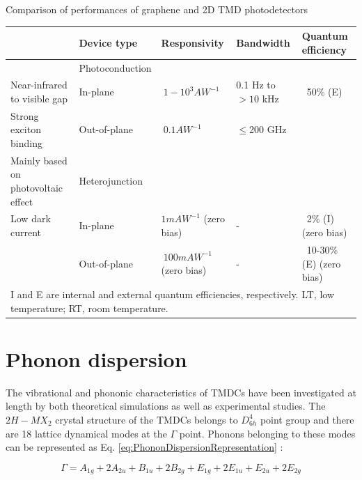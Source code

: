 \newpage
\begin{table}[!ht]
	\label{tab:GrapheneTMDCPhotodectorsComparison}
	\caption{Comparison of performances of graphene and 2D TMD photodetectors}
\end{table}

\begin{tiny}
\begin{center}
\begin{tabular}{l|llll}

									& Device type		& Responsivity				& Bandwidth			& Quantum efficiency	\\\hline
									& Photoconduction	& 							&					&						\\	
Near-infrared to visible gap		& In-plane			& $~1-10^3 AW^{-1}$			& 0.1 Hz to $>10$ kHz & ~50\% (E) 			\\
Strong exciton binding				& Out-of-plane		& $~0.1 AW^{-1}$			& $\leq$200 GHz 	& 						\\
Mainly based on photovoltaic effect & Heterojunction 	& 							& 					&						\\
Low dark current					& In-plane			& $1 mAW^{-1}$ (zero bias)	& - 				& ~2\% (I) (zero bias) 	\\
									& Out-of-plane		& $~100 mAW^{-1}$ (zero bias)& -				& ~10-30\% (E) (zero bias) \\\hline
\multicolumn{5}{l}{I and E are internal and external quantum efficiencies, respectively. LT, low temperature; RT, room temperature.}

\end{tabular}
\end{center}
\end{tiny}


	
\section{Phonon dispersion}
	
	The vibrational and phononic characteristics of TMDCs have been investigated at length by both theoretical simulations as well as experimental studies. The $2H-MX_2$ crystal structure of the TMDCs belongs to $D_{6h}^4$ point group and there are 18 lattice dynamical modes at the $\Gamma$ point. Phonons belonging to these modes can be represented as Eq. \ref{eq:PhononDispersionRepresentation} \cite{LatticeDynamicsInMono-AndFew-LayerSheetsOfWS2AndWSe2}: 
	
\begin{equation}
	{\Gamma} = A_{1g} + 2A_{2u} + B_{1u} + 2B_{2g} + E_{1g} + 2E_{1u} + E_{2u} + 2E_{2g}
	\label{eq:PhononDispersionRepresentation} 
\end{equation}
	
